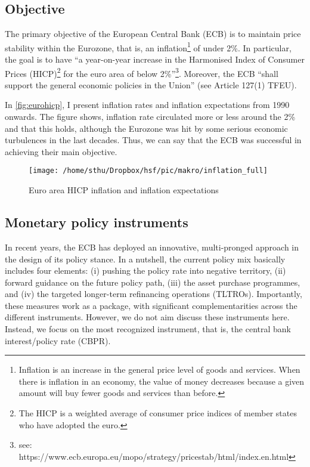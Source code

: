 \subsection{Objective}
The primary objective of the European Central Bank (ECB) is to maintain price stability within the Eurozone, that is, an inflation\footnote{Inflation is an increase in the general price level of goods and services. When there is inflation in an economy, the value of money decreases because a given amount will buy fewer goods and services than before.} of under 2\%. In particular, the goal is to have ``a year-on-year increase in the Harmonised Index of Consumer Prices (HICP)\footnote{The HICP is a weighted average of consumer price indices of member states who have adopted the euro.} for the euro area of below 2\%''\footnote{see: https://www.ecb.europa.eu/mopo/strategy/pricestab/html/index.en.html}. Moreover, the ECB ``shall support the general economic policies in the Union'' (see Article 127(1) TFEU).

In \autoref{fig:eurohicp}, I present inflation rates and inflation expectations from 1990 onwards. The figure shows, inflation rate circulated more or less around the 2\% and that this holds, although the Eurozone was hit by some serious economic turbulences in the last decades. Thus, we can say that the ECB was successful in achieving their main objective. 



\begin{figure}
	\begin{center}
		\texttt{[image: /home/sthu/Dropbox/hsf/pic/makro/inflation\_full]}
	\end{center}
\caption{Euro area HICP inflation and inflation expectations}\label{fig:eurohicp}
\end{figure}

\subsection{Monetary policy instruments}
In recent years, the ECB has deployed an innovative, multi-pronged approach in the design of its policy stance. In a nutshell, the current policy mix basically includes four elements: (i) pushing the policy rate into negative territory, (ii) forward guidance on the future policy path, (iii) the asset purchase programmes, and (iv) the targeted longer-term refinancing operations (TLTROs). Importantly, these measures work as a package, with significant complementarities across the different instruments. However, we do not aim discuss these instruments here. Instead, we focus on the most recognized instrument, that is, the central bank interest/policy rate (CBPR). 


